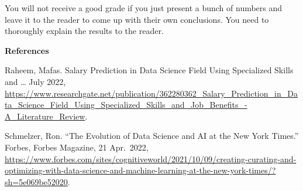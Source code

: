\documentclass[
]{article}
\begin{document}
You will not receive a good grade if you just present a bunch of numbers
and leave it to the reader to come up with their own conclusions. You
need to thoroughly explain the results to the reader.

\textbf{References}

Raheem, Mafas. Salary Prediction in Data Science Field Using Specialized
Skills and \ldots{} July 2022,
\url{https://www.researchgate.net/publication/362280362_Salary_Prediction_in_Data_Science_Field_Using_Specialized_Skills_and_Job_Benefits_-A_Literature_Review}.

Schmelzer, Ron. ``The Evolution of Data Science and AI at the New York
Times.'' Forbes, Forbes Magazine, 21 Apr.~2022,
\url{https://www.forbes.com/sites/cognitiveworld/2021/10/09/creating-curating-and-optimizing-with-data-science-and-machine-learning-at-the-new-york-times/?sh=5e069be52020}.
\end{document}
